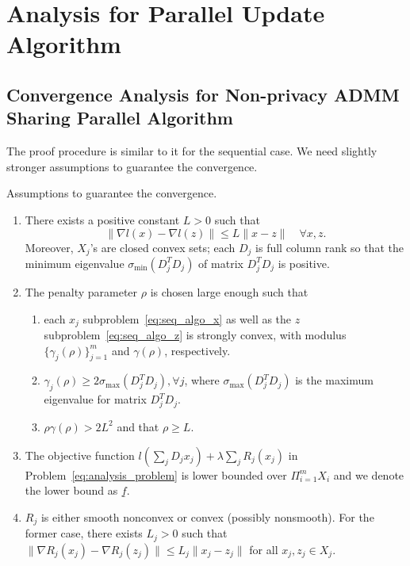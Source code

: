 


\section{Analysis for Parallel Update Algorithm}
\subsection{Convergence Analysis for Non-privacy ADMM Sharing Parallel Algorithm}
The proof procedure is similar to it for the sequential case. We need slightly stronger assumptions to guarantee the convergence. 
\begin{assume}\label{theo:assumptions_pal}
Assumptions to guarantee the convergence. 
\begin{enumerate}
    \item There exists a positive constant $L>0$ such that 
        \[
            \|\nabla l(x)-\nabla l(z)\| \le L\|x-z\|\quad \forall x, z.
        \]
        Moreover, $X_j$'s are closed convex sets; each $D_j$ is full column rank so that the minimum eigenvalue $\sigma_{\text{min}}(D^T_jD_j)$ of matrix $D^T_jD_j$ is positive.\label{item:assum_1_pal}
    \item The penalty parameter $\rho$ is chosen large enough such that
    \begin{enumerate}
        \item each $x_j$ subproblem~\eqref{eq:seq_algo_x} as well as the $z$ subproblem~\eqref{eq:seq_algo_z} is strongly convex, with modulus $\{\gamma_j(\rho)\}_{j=1}^m$ and $\gamma(\rho)$, respectively. \label{item:asusum_2_1_pal}
        \item $\gamma_j(\rho)\ge 2\sigma_{\text{max}}(D^T_jD_j), \forall j$, where $\sigma_{\text{max}}(D^T_jD_j)$ is the maximum eigenvalue for matrix $D^T_jD_j$. 
        \item $\rho\gamma(\rho)>2L^2$ and that $\rho\ge L$.
    \end{enumerate}
    \label{item:assum_2_pal}
    \item The objective function $l\left(\sum_j D_jx_j\right) + \lambda\sum_j R_j(x_j)$ in Problem~\ref{eq:analysis_problem} is lower bounded over $\Pi_{i=1}^mX_i$ and we denote the lower bound as $\underline{f}$.\label{item:assum_3_pal}
    \item $R_j$ is either smooth nonconvex or convex (possibly nonsmooth). For the former case, there exists $L_j>0$ such that $\|\nabla R_j(x_j) - \nabla R_j(z_j)\|\le L_j\|x_j-z_j\|$ for all $x_j, z_j\in X_j$.
\end{enumerate}
\end{assume}
